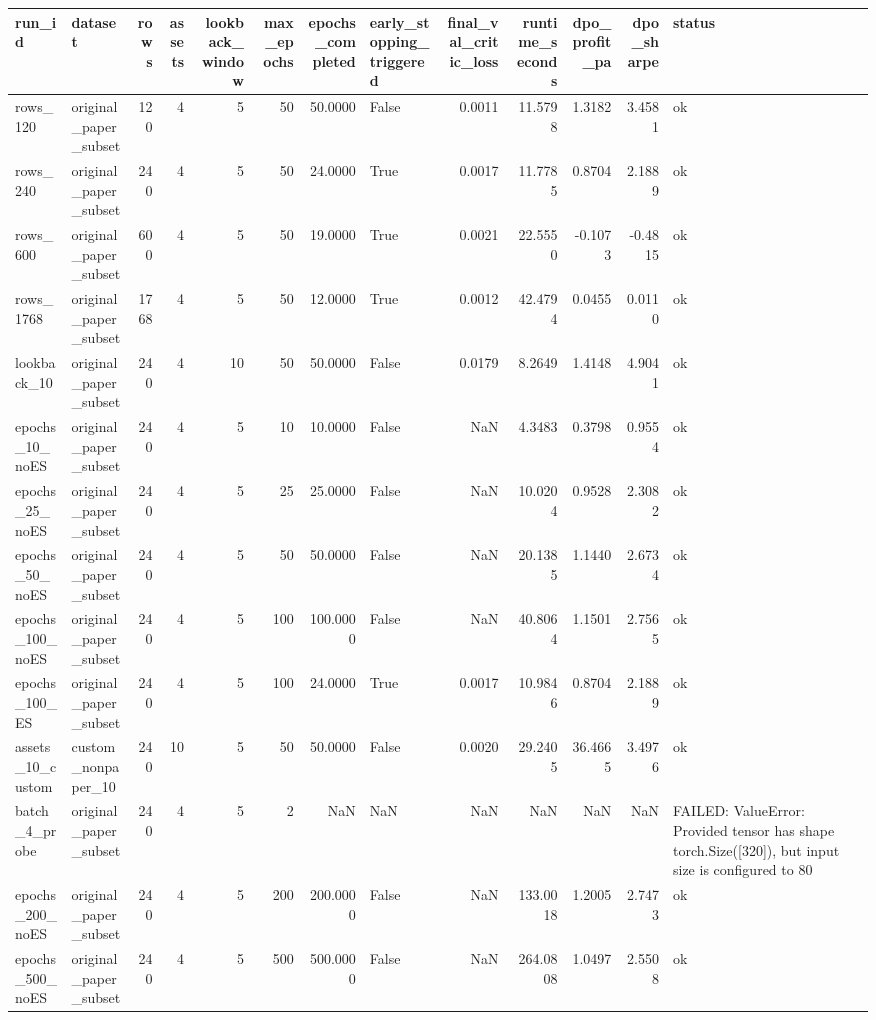 \begin{tabular}{llrrrrrlrrrrl}
\toprule
run_id & dataset & rows & assets & lookback_window & max_epochs & epochs_completed & early_stopping_triggered & final_val_critic_loss & runtime_seconds & dpo_profit_pa & dpo_sharpe & status \\
\midrule
rows_120 & original_paper_subset & 120 & 4 & 5 & 50 & 50.0000 & False & 0.0011 & 11.5798 & 1.3182 & 3.4581 & ok \\
rows_240 & original_paper_subset & 240 & 4 & 5 & 50 & 24.0000 & True & 0.0017 & 11.7785 & 0.8704 & 2.1889 & ok \\
rows_600 & original_paper_subset & 600 & 4 & 5 & 50 & 19.0000 & True & 0.0021 & 22.5550 & -0.1073 & -0.4815 & ok \\
rows_1768 & original_paper_subset & 1768 & 4 & 5 & 50 & 12.0000 & True & 0.0012 & 42.4794 & 0.0455 & 0.0110 & ok \\
lookback_10 & original_paper_subset & 240 & 4 & 10 & 50 & 50.0000 & False & 0.0179 & 8.2649 & 1.4148 & 4.9041 & ok \\
epochs_10_noES & original_paper_subset & 240 & 4 & 5 & 10 & 10.0000 & False & NaN & 4.3483 & 0.3798 & 0.9554 & ok \\
epochs_25_noES & original_paper_subset & 240 & 4 & 5 & 25 & 25.0000 & False & NaN & 10.0204 & 0.9528 & 2.3082 & ok \\
epochs_50_noES & original_paper_subset & 240 & 4 & 5 & 50 & 50.0000 & False & NaN & 20.1385 & 1.1440 & 2.6734 & ok \\
epochs_100_noES & original_paper_subset & 240 & 4 & 5 & 100 & 100.0000 & False & NaN & 40.8064 & 1.1501 & 2.7565 & ok \\
epochs_100_ES & original_paper_subset & 240 & 4 & 5 & 100 & 24.0000 & True & 0.0017 & 10.9846 & 0.8704 & 2.1889 & ok \\
assets_10_custom & custom_nonpaper_10 & 240 & 10 & 5 & 50 & 50.0000 & False & 0.0020 & 29.2405 & 36.4665 & 3.4976 & ok \\
batch_4_probe & original_paper_subset & 240 & 4 & 5 & 2 & NaN & NaN & NaN & NaN & NaN & NaN & FAILED: ValueError: Provided tensor has shape torch.Size([320]), but input size is configured to 80 \\
epochs_200_noES & original_paper_subset & 240 & 4 & 5 & 200 & 200.0000 & False & NaN & 133.0018 & 1.2005 & 2.7473 & ok \\
epochs_500_noES & original_paper_subset & 240 & 4 & 5 & 500 & 500.0000 & False & NaN & 264.0808 & 1.0497 & 2.5508 & ok \\
\bottomrule
\end{tabular}
